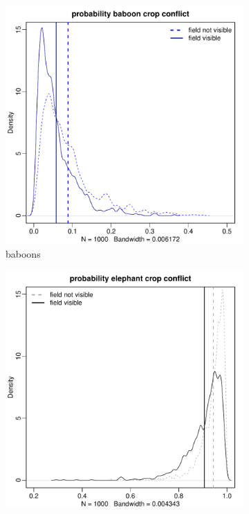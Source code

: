 \documentclass[12pt,]{article}
\begin{document}

\begin{figure}[H]
  \centering
	\begin{subfigure}[b]{0.49\textwidth}
	\includegraphics[width=\textwidth]{Figures/seefield_crop_global_conflict_bab.pdf} 
    \caption{baboons}
   	    \label{fig:cropSEEbab}
\end{subfigure}
\begin{subfigure}[b]{0.49\textwidth}
	\includegraphics[width=\textwidth]{Figures/seefield_crop_global_conflict_ele.pdf}  

\end{subfigure}
\end{figure}
\end{document}
